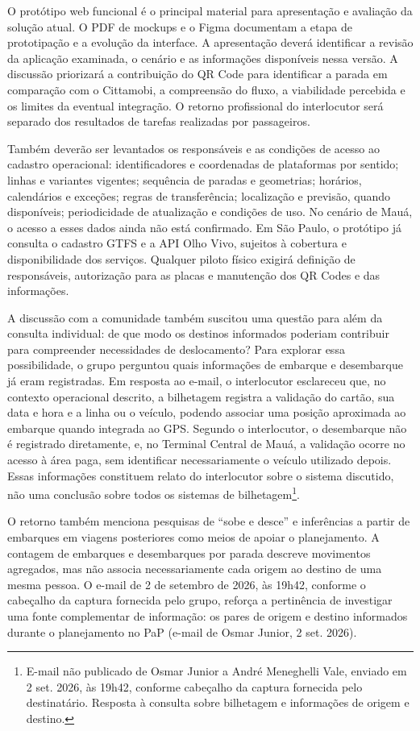 \documentclass[12pt,oneside,a4paper,brazil,chapter=TITLE]{abntex2}
\begin{document}
O protótipo web funcional é o principal material para apresentação e avaliação da solução atual. O PDF de mockups e o Figma documentam a etapa de prototipação e a evolução da interface. A apresentação deverá identificar a revisão da aplicação examinada, o cenário e as informações disponíveis nessa versão. A discussão priorizará a contribuição do QR Code para identificar a parada em comparação com o Cittamobi, a compreensão do fluxo, a viabilidade percebida e os limites da eventual integração. O retorno profissional do interlocutor será separado dos resultados de tarefas realizadas por passageiros.

Também deverão ser levantados os responsáveis e as condições de acesso ao cadastro operacional: identificadores e coordenadas de plataformas por sentido; linhas e variantes vigentes; sequência de paradas e geometrias; horários, calendários e exceções; regras de transferência; localização e previsão, quando disponíveis; periodicidade de atualização e condições de uso. No cenário de Mauá, o acesso a esses dados ainda não está confirmado. Em São Paulo, o protótipo já consulta o cadastro GTFS e a API Olho Vivo, sujeitos à cobertura e disponibilidade dos serviços. Qualquer piloto físico exigirá definição de responsáveis, autorização para as placas e manutenção dos QR Codes e das informações.

A discussão com a comunidade também suscitou uma questão para além da consulta individual: de que modo os destinos informados poderiam contribuir para compreender necessidades de deslocamento? Para explorar essa possibilidade, o grupo perguntou quais informações de embarque e desembarque já eram registradas. Em resposta ao e-mail, o interlocutor esclareceu que, no contexto operacional descrito, a bilhetagem registra a validação do cartão, sua data e hora e a linha ou o veículo, podendo associar uma posição aproximada ao embarque quando integrada ao GPS. Segundo o interlocutor, o desembarque não é registrado diretamente, e, no Terminal Central de Mauá, a validação ocorre no acesso à área paga, sem identificar necessariamente o veículo utilizado depois. Essas informações constituem relato do interlocutor sobre o sistema discutido, não uma conclusão sobre todos os sistemas de bilhetagem\footnote{E-mail não publicado de Osmar Junior a André Meneghelli Vale, enviado em 2 set. 2026, às 19h42, conforme cabeçalho da captura fornecida pelo destinatário. Resposta à consulta sobre bilhetagem e informações de origem e destino.}.

O retorno também menciona pesquisas de ``sobe e desce'' e inferências a partir de embarques em viagens posteriores como meios de apoiar o planejamento. A contagem de embarques e desembarques por parada descreve movimentos agregados, mas não associa necessariamente cada origem ao destino de uma mesma pessoa. O e-mail de 2 de setembro de 2026, às 19h42, conforme o cabeçalho da captura fornecida pelo grupo, reforça a pertinência de investigar uma fonte complementar de informação: os pares de origem e destino informados durante o planejamento no PaP (e-mail de Osmar Junior, 2 set. 2026).
\end{document}
